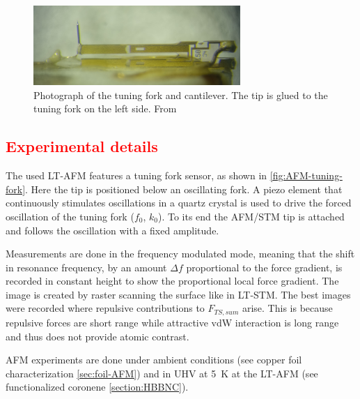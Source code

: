 \begin{figure}\centering
	\includegraphics[width=0.7\textwidth]{./images/AFM-qplus-photograph}
	\caption{Photograph of the tuning fork and cantilever. The tip is glued to the tuning fork on the left side. From \cite{he_bottom-up_2017}}
	\label{fig:AFM-tuning-fork}
\end{figure}

\subsection{\textcolor{red}{\textbf{Experimental details}}}
The used LT-AFM features a tuning fork sensor, as shown in \autoref{fig:AFM-tuning-fork}. Here the tip is positioned below an oscillating fork.  A piezo element that continuously stimulates oscillations in a quartz crystal is used to drive the forced oscillation of the tuning fork ($f_0$, $k_0$). To its end the AFM/STM tip is attached and follows the oscillation with a fixed amplitude.

Measurements are done in the frequency modulated mode, meaning that the shift in resonance frequency, by an amount $\Delta f$  proportional to the force gradient, is recorded in constant height to show the proportional local force gradient. The image is created by raster scanning the surface like in LT-STM. The best images were recorded where repulsive contributions to $F_{TS,sum}$ arise. This is because repulsive forces are short range while attractive vdW interaction is long range and thus does not provide atomic contrast.

AFM experiments are done under ambient conditions (see copper foil characterization \autoref{sec:foil-AFM}) and in UHV at \SI{5}{\kelvin} at the LT-AFM (see functionalized coronene \autoref{section:HBBNC}).

%
